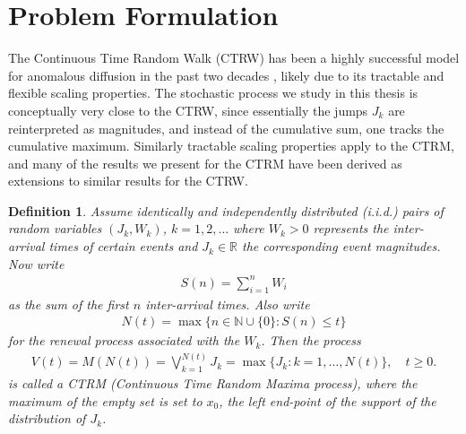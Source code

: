 \documentclass[honours,12pt,twoside, openright]{unswthesis}
\newcommand{\R}{\mathbb{R}}
\newcommand{\1}{\mathbf 1}
\newtheorem{definition}[equation]{Definition}
\numberwithin{equation}{section}
\theoremstyle{definition}
\theoremstyle{remark}
\begin{document}
\section{Problem Formulation}
The Continuous Time Random Walk (CTRW) has been a highly successful 
model for anomalous diffusion in the past two decades 
\cite{Metzler2000,HLS2010b}, likely due to its tractable and flexible scaling
properties. The stochastic process we study in this thesis is conceptually very close
to the CTRW, since essentially the jumps $J_k$ are reinterpreted as 
magnitudes, and instead of the cumulative sum, one tracks the cumulative 
maximum. Similarly tractable scaling properties apply to the CTRM, and many of the results we present for the CTRM have been derived as extensions to similar results for the CTRW.\\

\begin{definition}
Assume identically and independently distributed (i.i.d.) pairs of random variables $(J_k, W_k)$, $k = 1, 2, \ldots$
where $W_k > 0$ represents the inter-arrival times of certain events and 
$J_k \in \R$ the corresponding event magnitudes. Now write
\begin{align}
	S(n)=\sum_{i=1}^n W_i
\end{align}
as the sum of the first $n$ inter-arrival times. Also write
\begin{align} \label{eq:renewal-process}
N(t) = \max\{n \in \mathbb N \cup \{0\}: S(n) \le t\}
\end{align}
for the renewal process associated with the $W_k$. Then the process
\begin{align}
V(t)=M(N(t)) = \bigvee_{k=1}^{N(t)} J_k
= \max\{J_k: k = 1, \ldots, N(t)\}, \quad t \ge 0.
\end{align}
is called a CTRM (Continuous Time Random Maxima process), where the maximum of 
the empty set is set to $x_0$, the left end-point of the support of the distribution
of $J_k$.\\
\end{definition}
\end{document}

